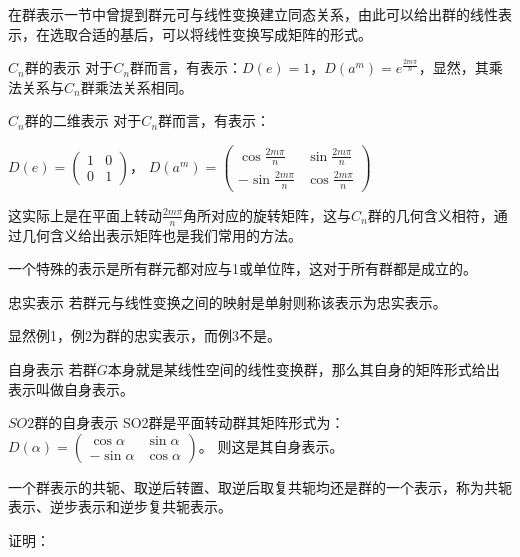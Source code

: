 \begin{issues}
\issueDraft
\end{issues}
在群表示一节中曾提到群元可与线性变换建立同态关系，由此可以给出群的线性表示，在选取合适的基后，可以将线性变换写成矩阵的形式。

\begin{example}{$C_n$群的表示}
对于$C_n$群而言，有表示：$D(e)=1$，$D(a^m)=e^{\frac{2m\pi}{n}}$，显然，其乘法关系与$C_n$群乘法关系相同。
\label{gprep_ex1}
\end{example}

\begin{example}{$C_n$群的二维表示}
对于$C_n$群而言，有表示：

$D(e)=\begin{pmatrix}
 1 & 0\\
 0 &1
\end{pmatrix}$，
$D(a^m)=\begin{pmatrix}
 \cos{\frac{2m\pi}{n}} & \sin{\frac{2m\pi}{n}}\\
 -\sin{\frac{2m\pi}{n}} &\cos{\frac{2m\pi}{n}}
\end{pmatrix}$

这实际上是在平面上转动$\frac{2m\pi}{n}$角所对应的旋转矩阵，这与$C_n$群的几何含义相符，通过几何含义给出表示矩阵也是我们常用的方法。
\end{example}

\begin{example}{}
一个特殊的表示是所有群元都对应与1或单位阵，这对于所有群都是成立的。
\label{gprep_ex3}
\end{example}

\begin{definition}{忠实表示}
若群元与线性变换之间的映射是单射则称该表示为忠实表示。
\end{definition}

显然例1，例2为群的忠实表示，而例3不是。

\begin{definition}{自身表示}
若群$G$本身就是某线性空间的线性变换群，那么其自身的矩阵形式给出表示叫做自身表示。
\end{definition}
\begin{example}{$SO2$群的自身表示}
SO2群是平面转动群其矩阵形式为：$D(\alpha)=\begin{pmatrix}
 \cos{\alpha} & \sin{\alpha}\\
 -\sin{\alpha} & \cos{\alpha}
\end{pmatrix}$。
则这是其自身表示。
\end{example}

\begin{corollary}{}
一个群表示的共轭、取逆后转置、取逆后取复共轭均还是群的一个表示，称为共轭表示、逆步表示和逆步复共轭表示。
\end{corollary}

证明：

